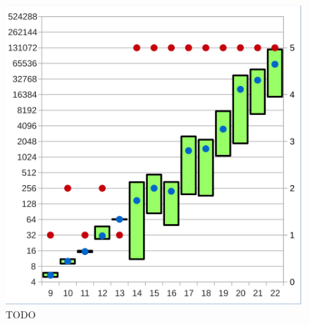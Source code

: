 \begin{figure}[!h]
\begin{minipage}[t]{0.45\textwidth}
  \includegraphics[scale=0.55]{images/data_base_xor}
  \end{minipage}
  \caption{TODO}
  \label{fig:data_base}
\end{figure}